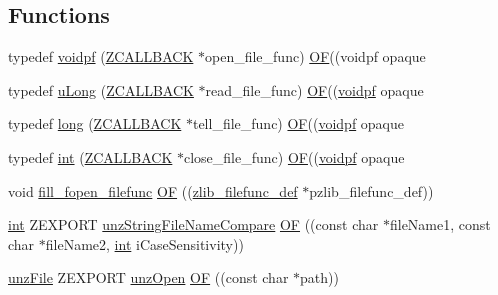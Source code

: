 \subsection*{Functions}
\begin{DoxyCompactItemize}
\item 
typedef \hyperlink{namespacezlib_a2bc9778594c329ce309c43185bc3f9eb}{voidpf} (\hyperlink{ioapi_8h_aace96475a6dd2915bc55bc542d7aa8a5}{Z\+C\+A\+L\+L\+B\+A\+CK} $\ast$open\+\_\+file\+\_\+func) \hyperlink{namespacezlib_a51f7082e5a7503071ac9f75900f7b42c}{OF}((voidpf opaque
\item 
typedef \hyperlink{namespacezlib_a3bc0123d9337acd75d286df79e6cf7da}{u\+Long} (\hyperlink{ioapi_8h_aace96475a6dd2915bc55bc542d7aa8a5}{Z\+C\+A\+L\+L\+B\+A\+CK} $\ast$read\+\_\+file\+\_\+func) \hyperlink{namespacezlib_a51f7082e5a7503071ac9f75900f7b42c}{OF}((\hyperlink{namespacezlib_a2bc9778594c329ce309c43185bc3f9eb}{voidpf} opaque
\item 
typedef \hyperlink{namespacezlib_a2687cf555d9f1239210afb6f2adcd9a1}{long} (\hyperlink{ioapi_8h_aace96475a6dd2915bc55bc542d7aa8a5}{Z\+C\+A\+L\+L\+B\+A\+CK} $\ast$tell\+\_\+file\+\_\+func) \hyperlink{namespacezlib_a51f7082e5a7503071ac9f75900f7b42c}{OF}((\hyperlink{namespacezlib_a2bc9778594c329ce309c43185bc3f9eb}{voidpf} opaque
\item 
typedef \hyperlink{namespacezlib_a0c9da18d93722fcf02a354ae2b6ec1ba}{int} (\hyperlink{ioapi_8h_aace96475a6dd2915bc55bc542d7aa8a5}{Z\+C\+A\+L\+L\+B\+A\+CK} $\ast$close\+\_\+file\+\_\+func) \hyperlink{namespacezlib_a51f7082e5a7503071ac9f75900f7b42c}{OF}((\hyperlink{namespacezlib_a2bc9778594c329ce309c43185bc3f9eb}{voidpf} opaque
\item 
void \hyperlink{ioapi_8c_ab44f1d585b26ce7f9447a91ada432727}{fill\+\_\+fopen\+\_\+filefunc} \hyperlink{namespacezlib_a51f7082e5a7503071ac9f75900f7b42c}{OF} ((\hyperlink{namespacezlib_a4ada5a935fba7f21209bc451eb7ffbc7}{zlib\+\_\+filefunc\+\_\+def} $\ast$pzlib\+\_\+filefunc\+\_\+def))
\item 
\hyperlink{namespacezlib_a0c9da18d93722fcf02a354ae2b6ec1ba}{int} Z\+E\+X\+P\+O\+RT \hyperlink{unzip_8c_aaf81e433f9a497102e477a59d783ae18}{unz\+String\+File\+Name\+Compare} \hyperlink{namespacezlib_ab929b496106137b4db7ce431e43400d5}{OF} ((const char $\ast$file\+Name1, const char $\ast$file\+Name2, \hyperlink{namespacezlib_a0c9da18d93722fcf02a354ae2b6ec1ba}{int} i\+Case\+Sensitivity))
\item 
\hyperlink{namespacezlib_a48c1eb530e72d2132ea9cb6648f4047e}{unz\+File} Z\+E\+X\+P\+O\+RT \hyperlink{unzip_8c_a614a4ee72e9055e5657d28487c2a7936}{unz\+Open} \hyperlink{namespacezlib_a4ed1c132c434df9aa80c3d20ca68f01f}{OF} ((const char $\ast$path))

\end{DoxyCompactItemize}
